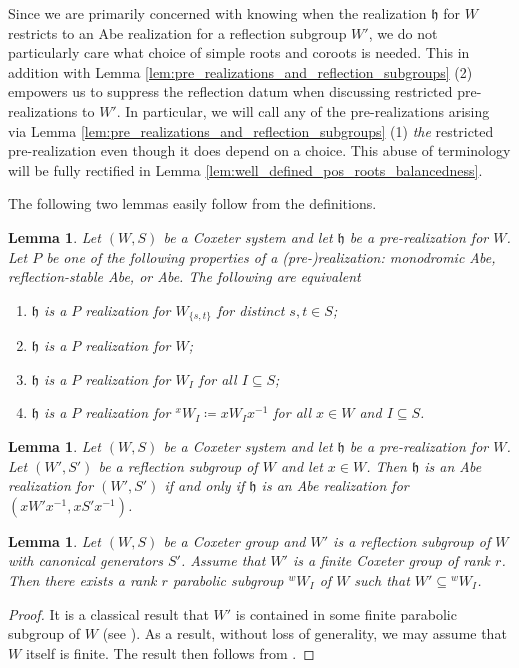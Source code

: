 \documentclass{amsart}
\newcommand{\fr}[1]{\mathfrak{#1}}
\newtheorem{lemma}[subsubsection]{Lemma}
\theoremstyle{definition}
\numberwithin{equation}{subsection}
\begin{document}
Since we are primarily concerned with knowing when the realization $\fr{h}$ for $W$ restricts to an Abe realization for a reflection subgroup $W'$, we do not particularly care what choice of simple roots and coroots is needed.
This in addition with Lemma \ref{lem:pre_realizations_and_reflection_subgroups} (2) empowers us to suppress the reflection datum when discussing restricted pre-realizations to $W'$.
In particular, we will call any of the pre-realizations arising via Lemma \ref{lem:pre_realizations_and_reflection_subgroups} (1) \emph{the} restricted pre-realization even though it does depend on a choice.
This abuse of terminology will be fully rectified in Lemma \ref{lem:well_defined_pos_roots_balancedness}.

The following two lemmas easily follow from the definitions.

\begin{lemma}\label{lem:parabolic_subgroups_and_Abe_realizations}
    Let $(W,S)$ be a Coxeter system and let $\fr{h}$ be a pre-realization for $W$. 
    Let $P$ be one of the following properties of a (pre-)realization: monodromic Abe, reflection-stable Abe, or Abe.
    The following are equivalent
    \begin{enumerate}
        \item $\fr{h}$ is a $P$ realization for $W_{\{s,t\}}$ for distinct $s,t \in S$;
        \item $\fr{h}$ is a $P$ realization for $W$;
        \item $\fr{h}$ is a $P$ realization for $W_I$ for all $I \subseteq S$;
        \item $\fr{h}$ is a $P$ realization for ${}^x W_I \coloneq x W_I x^{-1}$ for all $x \in W$ and $I \subseteq S$.
    \end{enumerate}
\end{lemma}

\begin{lemma}\label{lem:refln_subgroups_conjugation_and_Abe}
    Let $(W,S)$ be a Coxeter system and let $\fr{h}$ be a pre-realization for $W$. 
    Let $(W', S')$ be a reflection subgroup of $W$ and let $x \in W$.
    Then $\fr{h}$ is an Abe realization for $(W',S')$ if and only if $\fr{h}$ is an Abe realization for $(xW'x^{-1}, xS'x^{-1})$.
\end{lemma}

\begin{lemma}\label{lem:parabolic_closures_of_refln_subgroups}
    Let $(W,S)$ be a Coxeter group and $W'$ is a reflection subgroup of $W$ with canonical generators $S'$.
    Assume that $W'$ is a finite Coxeter group of rank $r$. Then there exists a rank $r$ parabolic subgroup ${}^w W_I$ of $W$ such that $W' \subseteq {}^w W_I$. 
\end{lemma}
\begin{proof}
    It is a classical result that $W'$ is contained in some finite parabolic subgroup of $W$ (see \cite[Page 130]{Bourbaki}).
    As a result, without loss of generality, we may assume that $W$ itself is finite.
    The result then follows from \cite[Lemma 2.1]{DPR13}. 
\end{proof}
\end{document}
